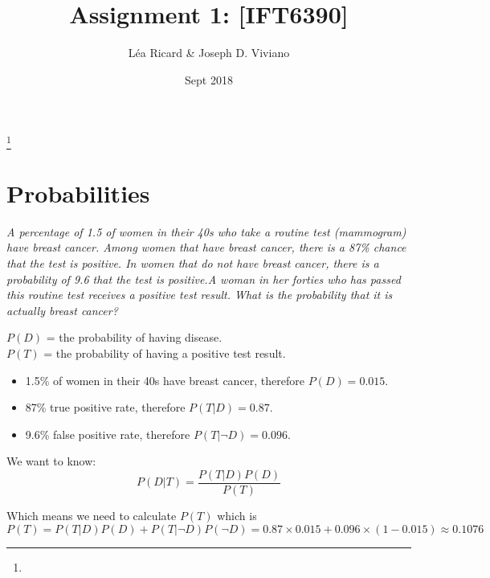 \documentclass{amsart}
\theoremstyle{definition}
\theoremstyle{remark}
\numberwithin{equation}{section}
\begin{document}
\title{Assignment 1: [IFT6390]}

\author{L\'ea Ricard \& Joseph D. Viviano}
\address{Universit\'e de Montr\'eal}
\curraddr{}
\thanks{}
\date{Sept 2018}

\maketitle

\section{Probabilities}

\textit{A percentage of 1.5 of women in their 40s who take a routine test 
(mammogram) have breast cancer. Among women that have breast cancer, there is a 
87\% chance that the test is positive. In women that do not have breast cancer, 
there is a probability of 9.6 that the test is positive.A woman in her forties 
who has passed this routine test receives a positive test result. What is the 
probability that it is actually breast cancer?}

$P(D)$ = the probability of having disease. \\
$P(T)$ = the probability of having a positive test result. \\

\begin{itemize}
    \item 1.5\% of women in their 40s have breast cancer, therefore $P(D) = 0.015$.
    \item 87\% true positive rate, therefore $P(T|D) = 0.87$.
    \item 9.6\% false positive rate, therefore $P(T|\neg D) = 0.096$.
\end{itemize}

We want to know: \\

\begin{equation}
P(D|T) = \frac{P(T|D) P(D)}{P(T)}
\end{equation}

Which means we need to calculate $P(T)$ which is \\

\begin{equation}
   P(T) = P(T|D)P(D) + P(T |\neg D)P(\neg D) 
        = 0.87 \times 0.015 + 0.096 \times (1-0.015) 
        \approx 0.1076 
\end{equation}
\end{document}
